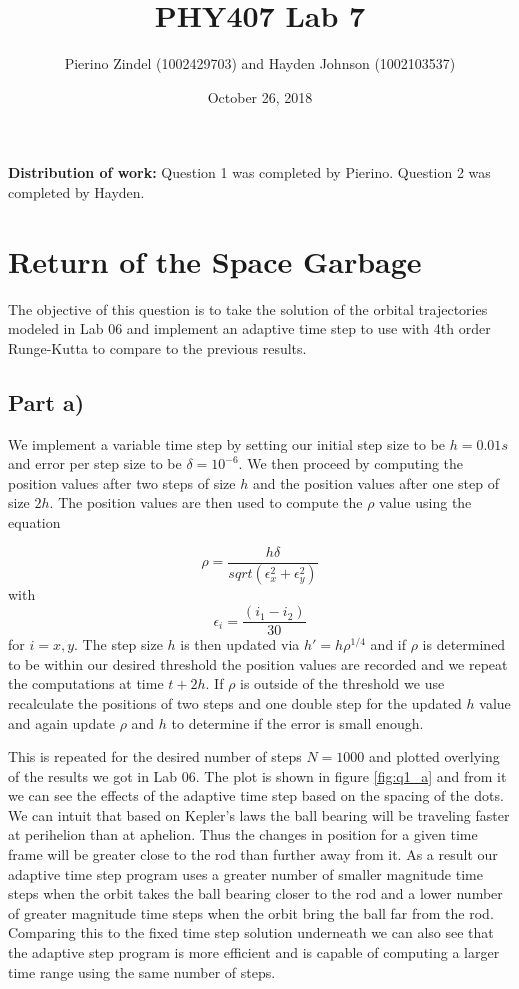 \documentclass{article}
\title{PHY407 Lab 7}
\author{Pierino Zindel (1002429703) and Hayden Johnson (1002103537)}
\date{October 26, 2018}
\begin{document}
\maketitle

\noindent \textbf{Distribution of work:} Question 1 was completed by Pierino. Question 2 was completed by Hayden.

\section{Return of the Space Garbage}
The objective of this question is to take the solution of the orbital trajectories modeled in Lab 06 and implement an adaptive time step to use with 4th order Runge-Kutta to compare to the previous results.

\subsection{Part a)}
We implement a variable time step by setting our initial step size to be $h=0.01s$ and error per step size to be $\delta=10^{-6}$. We then proceed by computing the position values after two steps of size $h$ and the position values after one step of size $2h$. The position values are then used to compute the $\rho$ value using the equation

\begin{equation}
	\rho = \frac{h\delta}{sqrt(\epsilon_x^2 + \epsilon_y^2)}
\end{equation}
with 
\begin{equation}
	\epsilon_i = \frac{(i_1-i_2)}{30}
\end{equation}
for $i=x,y$.
The step size $h$ is then updated via $h\prime = h\rho^{1/4}$ and if $\rho$ is determined to be within our desired threshold the position values are recorded and we repeat the computations at time $t+2h$. If $\rho$ is outside of the threshold we use recalculate the positions of two steps and one double step for the updated $h$ value and again update $\rho$ and $h$ to determine if the error is small enough.

This is repeated for the desired number of steps $N=1000$ and plotted overlying of the results we got in Lab 06. The plot is shown in figure \ref{fig:q1_a} and from it we can see the effects of the adaptive time step based on the spacing of the dots. We can intuit that based on Kepler's laws the ball bearing will be traveling faster at perihelion than at aphelion. Thus the changes in position for a given time frame will be greater close to the rod than further away from it. As a result our adaptive time step program uses a greater number of smaller magnitude time steps when the orbit takes the ball bearing closer to the rod and a lower number of greater magnitude time steps when the orbit bring the ball far from the rod. Comparing this to the fixed time step solution underneath we can also see that the adaptive step program is more efficient and is capable of computing a larger time range using the same number of steps. 
\end{document}
